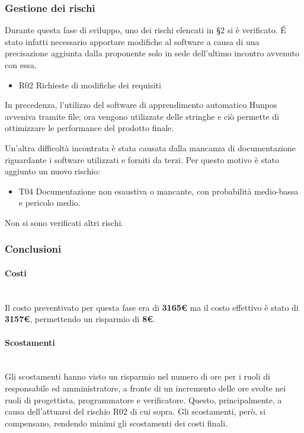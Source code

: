 	
\subsubsection{Gestione dei rischi}
Durante questa fase di sviluppo, uno dei rischi elencati in \S2 si è verificato. \'E stato infatti necessario apportare modifiche al software a causa di una precisazione aggiunta dalla proponente solo in sede dell'ultimo incontro avvenuto con essa. 
\begin{itemize}
	\item R02 Richieste di modifiche dei requisiti
\end{itemize}
In precedenza, l'utilizzo del software di apprendimento automatico Hunpos avveniva tramite file; ora vengono utilizzate delle stringhe e ciò permette di ottimizzare le performance del prodotto finale.

Un'altra difficoltà incontrata è stata causata dalla mancanza di documentazione riguardante i software utilizzati e forniti da terzi. Per questo motivo è stato aggiunto un nuovo rischio:
\begin{itemize}
	\item T04 Documentazione non esaustiva o mancante, con probabilità medio-bassa e pericolo medio. 
\end{itemize}

Non si sono verificati altri rischi. 
\subsubsection{Conclusioni}

\paragraph{Costi\\}\noindent\\
Il costo preventivato per questa fase era di \textbf{3165€} ma il costo effettivo è stato di \textbf{3157€}, permettendo un risparmio di \textbf{8€}. 
\paragraph{Scostamenti\\}\noindent \\
Gli scostamenti hanno visto un risparmio nel numero di ore per i ruoli di responsabile ed amministratore, a fronte di un incremento delle ore svolte nei ruoli di progettista, programmatore e verificatore. Questo, principalmente, a causa dell'attuarsi del rischio R02 di cui sopra. Gli scostamenti, però, si compensano, rendendo minimi gli scostamenti dei costi finali. 

